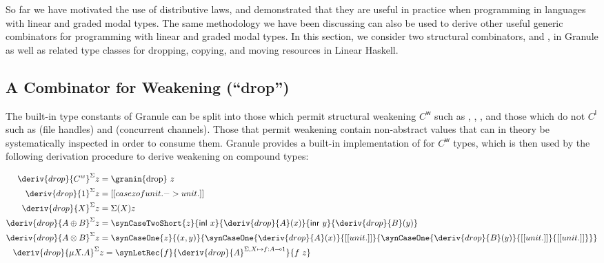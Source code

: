 So far we have motivated the use of distributive laws, and
demonstrated that they are useful in practice when programming in
languages with linear and graded modal types.
The same methodology we have been discussing can also be used to
derive other useful generic combinators for programming with linear
and graded modal types. In this section, we consider two structural
combinators,  and , in Granule as well
as related type classes for dropping, copying, and moving resources in Linear Haskell.

\subsection{A Combinator for Weakening (``drop'')}
\label{subsec:drop}

%
The built-in type constants of Granule can be split into those
which permit structural weakening $C^{\mathsf{w}}$ such as
, , , and those which do not
$C^{\mathsf{l}}$ such as  (file handles) and
 (concurrent channels). Those that
permit weakening contain non-abstract values that
can in theory be systematically inspected in order to consume them.
Granule provides a built-in implementation of 
for $C^{\mathsf{w}}$ types, which is then used by the following derivation
procedure to derive weakening on compound types:

\begin{align*}
    \deriv{drop}{C^w}^\Sigma z & = \text{\granin{drop} $z$} \\
    \deriv{drop}{1}^\Sigma z & = [[ case z of unit . -> unit . ]] \\
    \deriv{drop}{X}^\Sigma z & = \Sigma(X) z \\
    \deriv{drop}{A \oplus B}^\Sigma z & =
    \synCaseTwoShort{z}{\mathsf{inl}\ x}{\deriv{drop}{A}(x)}{\mathsf{inr}\ y}
                                {\deriv{drop}{B}(y)}\\
    \deriv{drop}{A \otimes B}^\Sigma z & =
    \synCaseOne{z}{(x, y)}
       {\synCaseOne{\deriv{drop}{A}(x)}{[[ unit . ]]}
         {\synCaseOne{\deriv{drop}{B}(y)}{[[ unit . ]]}{[[ unit . ]]}}}
    \\
    \deriv{drop}{\mu X . A}^\Sigma & z =
                                     \synLetRec{f}{\deriv{drop}{A}^{\Sigma,
                                     X \mapsto f : A \multimap 1}}{f\ z}
    \end{align*}

